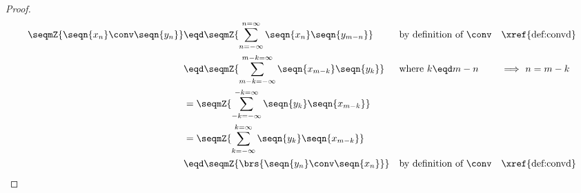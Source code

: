 \begin{proof}
\begin{align*}
  \seqmZ{\seqn{x_n}\conv\seqn{y_n}}
    &\eqd \seqmZ{\sum_{n=-\infty}^{n=\infty} \seqn{x_n}\seqn{y_{m-n}}}
    && \text{by definition of $\conv$}
    && \text{\xref{def:convd}}
  \\&\eqd \seqmZ{\sum_{m-k=-\infty}^{m-k=\infty} \seqn{x_{m-k}}\seqn{y_k}}
    && \text{where $k\eqd m-n$}
    && \text{$\implies$ $n=m-k$}
  \\&= \seqmZ{\sum_{-k=-\infty}^{-k=\infty}\seqn{y_k} \seqn{x_{m-k}}}
  \\&= \seqmZ{\sum_{k=-\infty}^{k=\infty}\seqn{y_k} \seqn{x_{m-k}}}
  \\&\eqd \seqmZ{\brs{\seqn{y_n}\conv\seqn{x_n}}}
    && \text{by definition of $\conv$}
    && \text{\xref{def:convd}}
\end{align*}


\end{proof}
